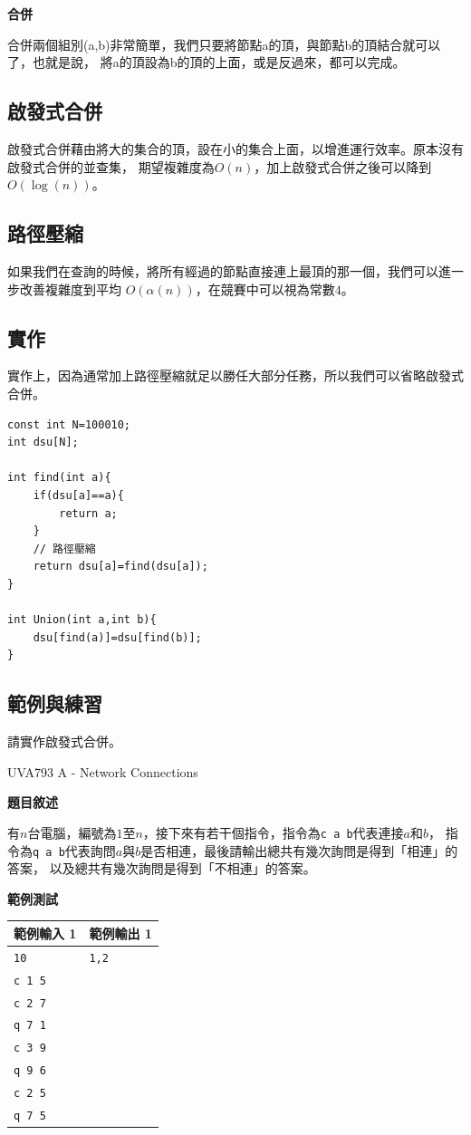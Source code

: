     \textbf{合併}

    合併兩個組別(a,b)非常簡單，我們只要將節點a的頂，與節點b的頂結合就可以了，也就是說，
    將a的頂設為b的頂的上面，或是反過來，都可以完成。

    \subsection{啟發式合併}
    啟發式合併藉由將大的集合的頂，設在小的集合上面，以增進運行效率。原本沒有啟發式合併的並查集，
    期望複雜度為$O(n)$，加上啟發式合併之後可以降到$O(\log{(n)})$。

    \subsection{路徑壓縮}
    如果我們在查詢的時候，將所有經過的節點直接連上最頂的那一個，我們可以進一步改善複雜度到平均
    $O(\alpha(n))$，在競賽中可以視為常數$4$。

    \subsection{實作}
    實作上，因為通常加上路徑壓縮就足以勝任大部分任務，所以我們可以省略啟發式合併。

\begin{lstlisting}[caption=DSU 實作]
const int N=100010;
int dsu[N];

int find(int a){
    if(dsu[a]==a){
        return a;
    }
    // 路徑壓縮
    return dsu[a]=find(dsu[a]);
}

int Union(int a,int b){
    dsu[find(a)]=dsu[find(b)];
}
\end{lstlisting}

    \subsection{範例與練習}

    \problem 請實作啟發式合併。

    \problem UVA793 A - Network Connections

    \textbf{題目敘述}

    有$n$台電腦，編號為$1$至$n$，接下來有若干個指令，指令為\verb|c a b|代表連接$a$和$b$，
    指令為\verb|q a b|代表詢問$a$與$b$是否相連，最後請輸出總共有幾次詢問是得到「相連」的答案，
    以及總共有幾次詢問是得到「不相連」的答案。

    \textbf{範例測試}

    \begin{tabular}{|m{7cm}|m{7cm}|}
        \hline
        範例輸入 1 & 範例輸出 1 \\
        \hline
        \verb|10|    & \verb|1,2| \\
        \verb|c 1 5| & \\
        \verb|c 2 7| & \\
        \verb|q 7 1| & \\
        \verb|c 3 9| & \\
        \verb|q 9 6| & \\
        \verb|c 2 5| & \\
        \verb|q 7 5| & \\
        \hline
    \end{tabular}

